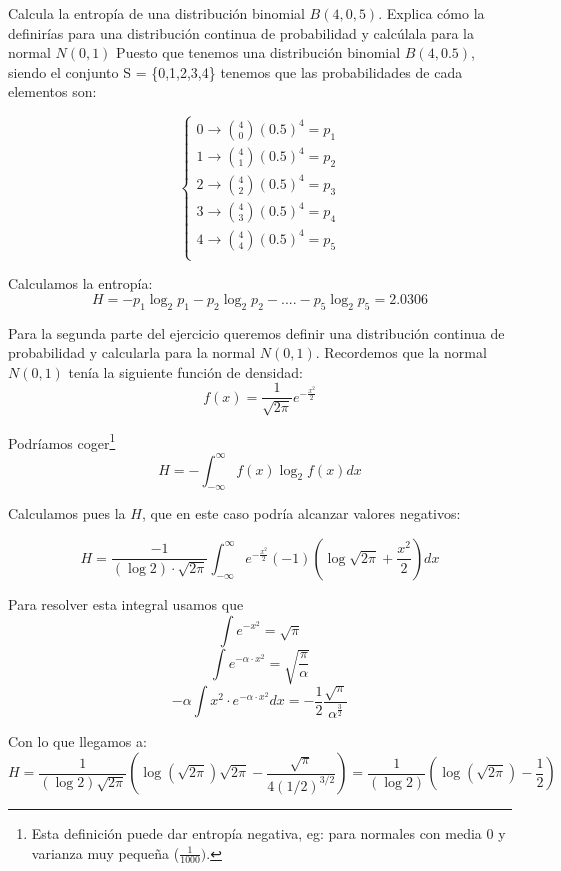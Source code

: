 \begin{problem}[4]
	Calcula la entropía de una distribución binomial $B(4,0,5)$. Explica cómo la definirías para una distribución continua de probabilidad y calcúlala para la normal $N(0,1)$
	\solution
	Puesto que tenemos una distribución binomial $B (4, 0.5)$, siendo el conjunto S = \{0,1,2,3,4\} tenemos que las probabilidades de cada elementos son:

	\[\begin{cases}
	0 \rightarrow {4 \choose 0} (0.5)^4 = p_1 \\
	1 \rightarrow {4 \choose 1} (0.5)^4 = p_2 \\
	2 \rightarrow {4 \choose 2} (0.5)^4 = p_3 \\
	3 \rightarrow {4 \choose 3} (0.5)^4 = p_4 \\
	4 \rightarrow {4 \choose 4} (0.5)^4 = p_5 \\
	\end{cases}\]

	Calculamos la entropía:
	$$H = -p_1 \log_2 p_1 -p_2 \log_2 p_2 - ....  -p_5 \log_2 p_5 = 2.0306 $$

	Para la segunda parte del ejercicio queremos definir una distribución continua de probabilidad y calcularla para la normal $N(0,1)$. Recordemos que la normal $N(0,1)$ tenía la siguiente función de densidad:
	$$f(x) = \frac{1}{\sqrt{2\pi}} e^{-\frac{x^2}{2}}$$

	Podríamos coger\footnote{Esta definición puede dar entropía negativa, eg: para normales con media 0 y varianza muy pequeña ($\frac{1}{1000})$.}
	$$H = -\int_{-\infty}^{\infty} f(x) \log_2 f(x) dx$$

	Calculamos pues la $H$, que en este caso podría alcanzar valores negativos:

	$$H = \frac{-1}{(\log 2) \cdot \sqrt{2\pi}} \int_{-\infty}^{\infty} e^{-\frac{x^2}{2}} (-1)\left(\log \sqrt{2\pi} + \frac{x^2}{2}\right) dx$$

	Para resolver esta integral usamos que
	$$\int e^{-x^2} = \sqrt{\pi}$$
	$$\int e^{-\alpha \cdot x^2} = \sqrt{\frac{\pi}{\alpha}}$$
	$$- \alpha\int x^2\cdot  e^{-\alpha \cdot x^2} dx = -\frac{1}{2}\frac{\sqrt{\pi}}{\alpha^{\frac{3}{2}}}$$

	Con lo que llegamos a:
	\[H = \frac{1}{(\log 2)\sqrt{2π}}\left(\log(\sqrt{2π})\sqrt{2π} -\frac{\sqrt{π}}{4(1/2)^{3/2}}\right)=\frac{1}{(\log 2)}\left(\log(\sqrt{2π}) - \frac{1}{2}\right)\]
\end{problem}

